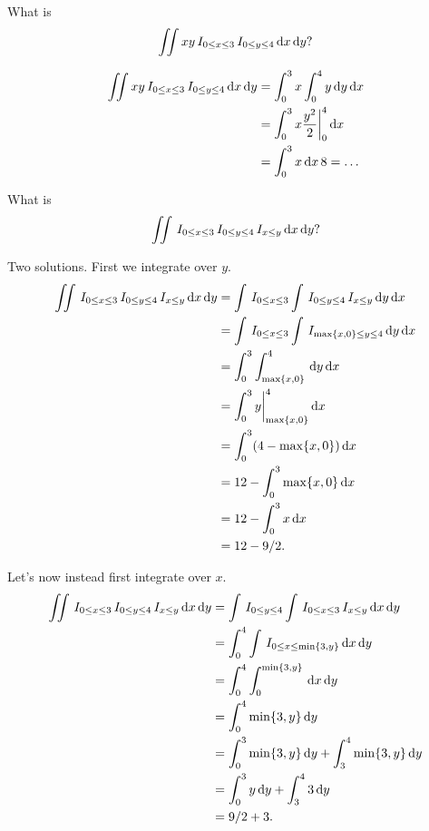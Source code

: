 \begin{exercise}
What is
\begin{equation}
\label{eq:5}
\iint xy \,I_{0\leq x \leq 3}\,I_{0\leq y \leq 4} \,\textrm{d}x \,\textrm{d}y?
\end{equation}
\begin{solution}
\begin{align*}
\iint xy \,I_{0\leq x \leq 3}\,I_{0\leq y \leq 4} \,\textrm{d}x \,\textrm{d}y
&=\int_{0}^{3} x \int_{0}^{4} y \,\textrm{d}y \,\textrm{d}x\\
&=\int_{0}^{3} x \frac{y^{2}} 2 \biggr|_{0}^{4} \,\textrm{d}x\\
&=\int_{0}^{3} x \,\textrm{d}x\, 8 = \ldots
\end{align*}
\end{solution}
\end{exercise}

\begin{exercise}
What is
\begin{align}
\label{eq:5}
\iint \,I_{0\leq x \leq 3} \,I_{0\leq y \leq 4}\,I_{x\leq y}\,\textrm{d}x \,\textrm{d}y?
\end{align}
\begin{solution}
Two solutions. First we integrate over $y$.
\begin{align}
\label{eq:5}
\iint \,I_{0\leq x \leq 3} \,I_{0\leq y \leq 4}\,I_{x\leq y}\,\textrm{d}x \,\textrm{d}y
&=\int \,I_{0\leq x \leq 3} \int \,I_{0\leq y \leq 4}\,I_{x\leq y}\,\textrm{d}y \,\textrm{d}x\\
&=\int \,I_{0\leq x \leq 3} \int \,I_{\max\{x, 0\} \leq y \leq 4}\,\textrm{d}y \,\textrm{d}x\\
&=\int_{0}^{3} \int_{\max\{x, 0\}}^{4}\,\textrm{d}y \,\textrm{d}x\\
&=\int_{0}^{3} y\biggr|_{\max\{x, 0\}}^{4} \,\textrm{d}x\\
&=\int_{0}^{3}  (4-\max\{x, 0\}) \,\textrm{d}x\\
&=12 - \int_{0}^{3} \max\{x, 0\} \,\textrm{d}x\\
&=12 - \int_{0}^{3} x  \,\textrm{d}x\\
&=12 - 9/2.
\end{align}

Let's now instead first integrate over $x$.
\begin{align}
\label{eq:5}
\iint \,I_{0\leq x \leq 3} \,I_{0\leq y \leq 4}\,I_{x\leq y}\,\textrm{d}x \,\textrm{d}y
&= \int \,I_{0\leq y \leq 4} \int \,I_{0\leq x \leq 3} \,I_{x\leq y}\,\textrm{d}x \,\textrm{d}y\\
&= \int_{0}^{4} \int \,I_{0\leq x \leq \min\{3, y\}}\,\textrm{d}x \,\textrm{d}y\\
&= \int_{0}^{4} \int_{0}^{\min\{3, y\}} \,\textrm{d}x \,\textrm{d}y\\
&= \int_{0}^{4} \min\{3, y\}\,\textrm{d}y\\
&= \int_{0}^{3} \min\{3, y\}\,\textrm{d}y + \int_{3}^{4} \min\{3, y\}\,\textrm{d}y\\
&= \int_{0}^{3} y \,\textrm{d}y + \int_{3}^{4}  3\,\textrm{d}y\\
&= 9/2 + 3.
\end{align}
\end{solution}
\end{exercise}


